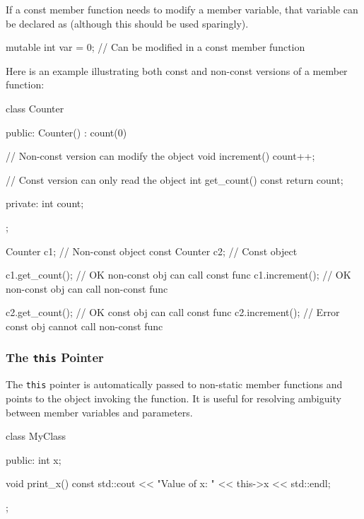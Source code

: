 \begin{tipsblock}
    If a const member function needs to modify a member variable, that variable can be declared as  (although this should be used sparingly).

\begin{codeblock}[language=C++, numbers=none]
mutable int var = 0; // Can be modified in a const member function
\end{codeblock}
\end{tipsblock}
\begin{exampleblock}
    Here is an example illustrating both const and non-const versions of a member function:
    \begin{codeblock}[language=C++]
class Counter {
public:
    Counter() : count(0) {}

    // Non-const version can modify the object
    void increment() {
        count++;
    }

    // Const version can only read the object
    int get_count() const {
        return count;
    }

private:
    int count;
};

Counter c1;       // Non-const object
const Counter c2; // Const object

c1.get_count();   // OK      non-const obj can call const func
c1.increment();   // OK      non-const obj can call non-const func

c2.get_count();   // OK      const obj can call const func
c2.increment();   // Error   const obj cannot call non-const func
    \end{codeblock}
\end{exampleblock}

\subsubsection{The \texttt{this} Pointer}

The \texttt{this} pointer is automatically passed to non-static member functions and points to the object invoking the function. It is useful for resolving ambiguity between member variables and parameters.

\begin{codeblock}[language=C++]
class MyClass {
public:
    int x;

    void print_x() const {
        std::cout << "Value of x: " << this->x << std::endl;
    }
};
\end{codeblock}


